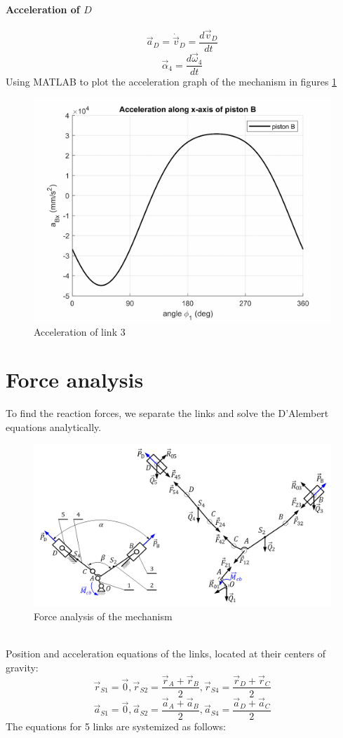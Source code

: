 \paragraph{Acceleration of $ D $}
\begin{equation}\label{aD}
\vec{a}_D=\dot{\vec{v}}_D=\dfrac{d\vec{v}_D}{dt}
\end{equation}
\[\vec{\alpha}_4=\dfrac{d\vec{\omega}_4}{dt}\]
Using MATLAB\textup{\textregistered} to plot the acceleration graph of the mechanism in figures \ref{fig:07}
\begin{figure}[h]
	\centering
	\includegraphics[width=0.7\linewidth]{07}
	\caption{Acceleration of link 3}
	\label{fig:07}
\end{figure}
\section{Force analysis}
To find the reaction forces, we separate the links and solve the D'Alembert equations analytically.
\begin{figure}[h]
	\centering
	\includegraphics[width=0.8\linewidth]{08}
	\caption{Force analysis of the mechanism}
	\label{fig:08}
\end{figure}\\
Position and acceleration equations of the links, located at their centers of gravity:
\begin{equation}\label{rS}
	\vec{r}_{S1}=\vec{0},\vec{r}_{S2}=\dfrac{\vec{r}_A+\vec{r}_B}{2},\vec{r}_{S4}=\dfrac{\vec{r}_D+\vec{r}_C}{2}
\end{equation}
\begin{equation}
\vec{a}_{S1}=\vec{0},\vec{a}_{S2}=\dfrac{\vec{a}_A+\vec{a}_B}{2},\vec{a}_{S4}=\dfrac{\vec{a}_D+\vec{a}_C}{2}
\end{equation}
The equations for 5 links are systemized as follows:
